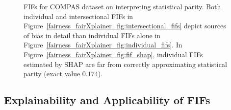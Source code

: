 \begin{figure}
	
	\caption[FIFs for COMPAS dataset]{FIFs for COMPAS dataset on interpreting statistical parity. Both individual and intersectional FIFs in Figure~\ref{fairness_fairXplainer_fig:intersectional_fifs} depict sources of bias in detail than individual FIFs alone in Figure~\ref{fairness_fairXplainer_fig:individual_fifs}. In Figure~\ref{fairness_fairXplainer_fig:fif_shap}, individual FIFs estimated by SHAP are far from correctly approximating statistical parity (exact value $0.174 $).}
	\label{fairness_fairXplainer_fig:fif_illustration_compas}
\end{figure}



\subsection{Explainability and Applicability of FIFs}
